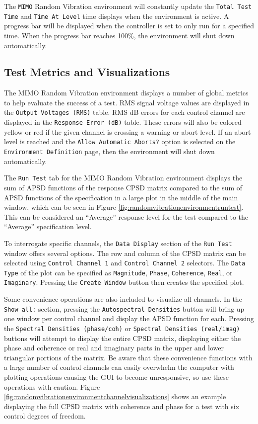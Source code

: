 \documentclass[pdf,12pt,report]{SANDreport}
\newcommand{\inlineCode}{\lstinline[basicstyle=\bfseries\ttfamily]}
\begin{document}
    The \inlineCode{MIMO} Random Vibration environment will constantly update the \inlineCode{Total Test Time} and \inlineCode{Time At Level} time displays when the environment is active.  A progress bar will be displayed when the controller is set to only run for a specified time.  When the progress bar reaches 100\%, the environment will shut down automatically.
    
    \subsection{Test Metrics and Visualizations}
    The \Ac{MIMO} Random Vibration environment displays a number of global metrics to help evaluate the success of a test.  \Ac{RMS} signal voltage values are displayed in the \inlineCode{Output Voltages (RMS)} table.  \Ac{RMS} dB errors for each control channel are displayed in the \inlineCode{Response Error (dB)} table.  These errors will also be colored yellow or red if the given channel is crossing a warning or abort level.  If an abort level is reached and the \inlineCode{Allow Automatic Aborts?} option is selected on the \inlineCode{Environment Definition} page, then the environment will shut down automatically.
    
    The \inlineCode{Run Test} tab for the \Ac{MIMO} Random Vibration environment displays the sum of \ac{APSD} functions of the response \ac{CPSD} matrix compared to the sum of \ac{APSD} functions of the specification in a large plot in the middle of the main window, which can be seen in Figure \ref{fig:randomvibrationenvironmentruntest}.  This can be considered an ``Average'' response level for the test compared to the ``Average'' specification level.
    
    To interrogate specific channels, the \inlineCode{Data Display} section of the \inlineCode{Run Test} window offers several options.  The row and column of the \ac{CPSD} matrix can be selected using \inlineCode{Control Channel 1} and \inlineCode{Control Channel 2} selectors.  The \inlineCode{Data Type} of the plot can be specified as \inlineCode{Magnitude}, \inlineCode{Phase}, \inlineCode{Coherence}, \inlineCode{Real}, or \inlineCode{Imaginary}.  Pressing the \inlineCode{Create Window} button then creates the specified plot.
    
    Some convenience operations are also included to visualize all channels.  In the \inlineCode{Show all:} section, pressing the \inlineCode{Autospectral Densities} button will bring up one window per control channel and display the \ac{APSD} function for each.  Pressing the \inlineCode{Spectral Densities (phase/coh)} or \inlineCode{Spectral Densities (real/imag)} buttons will attempt to display the entire \ac{CPSD} matrix, displaying either the phase and coherence or real and imaginary parts in the upper and lower triangular portions of the matrix.  Be aware that these convenience functions with a large number of control channels can easily overwhelm the computer with plotting operations causing the \ac{GUI} to become unresponsive, so use these operations with caution.  Figure \ref{fig:randomvibrationenvironmentchannelvisualizations} shows an example displaying the full \ac{CPSD} matrix with coherence and phase for a test with six control degrees of freedom. 
    
\end{document}
